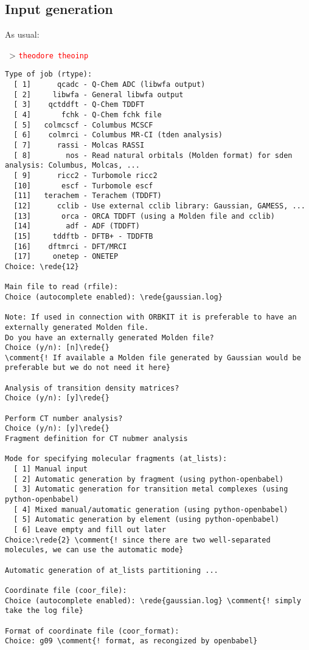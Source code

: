 \documentclass[DIV=12,headings=normal]{scrartcl}
\newcommand{\comment}[1]{\textcolor{blue}{#1}}
\newcommand{\redl}[1]{{\textcolor{red}{\texttt{#1}}}}
\newcommand{\rede}[1]{\redl{#1 <ENTER>}}
\newcommand{\comm}[1]{
\small
~> \redl{#1}
\normalsize
}
\newcounter{number}
\begin{document}
\subsection{Input generation}
As usual:

\comm{theodore theoinp}

\scriptsize
\begin{Verbatim}[commandchars=\\\{\}]
Type of job (rtype):
  [ 1]      qcadc - Q-Chem ADC (libwfa output)
  [ 2]     libwfa - General libwfa output
  [ 3]    qctddft - Q-Chem TDDFT
  [ 4]       fchk - Q-Chem fchk file
  [ 5]   colmcscf - Columbus MCSCF
  [ 6]    colmrci - Columbus MR-CI (tden analysis)
  [ 7]      rassi - Molcas RASSI
  [ 8]        nos - Read natural orbitals (Molden format) for sden analysis: Columbus, Molcas, ...
  [ 9]      ricc2 - Turbomole ricc2
  [10]       escf - Turbomole escf
  [11]   terachem - Terachem (TDDFT)
  [12]      cclib - Use external cclib library: Gaussian, GAMESS, ...
  [13]       orca - ORCA TDDFT (using a Molden file and cclib)
  [14]        adf - ADF (TDDFT)
  [15]     tddftb - DFTB+ - TDDFTB
  [16]    dftmrci - DFT/MRCI
  [17]     onetep - ONETEP
Choice: \rede{12}

Main file to read (rfile):
Choice (autocomplete enabled): \rede{gaussian.log}

Note: If used in connection with ORBKIT it is preferable to have an externally generated Molden file.
Do you have an externally generated Molden file?
Choice (y/n): [n]\rede{}
\comment{! If available a Molden file generated by Gaussian would be preferable but we do not need it here}

Analysis of transition density matrices?
Choice (y/n): [y]\rede{}

Perform CT number analysis?
Choice (y/n): [y]\rede{}
Fragment definition for CT nubmer analysis

Mode for specifying molecular fragments (at_lists):
  [ 1] Manual input
  [ 2] Automatic generation by fragment (using python-openbabel)
  [ 3] Automatic generation for transition metal complexes (using python-openbabel)
  [ 4] Mixed manual/automatic generation (using python-openbabel)
  [ 5] Automatic generation by element (using python-openbabel)
  [ 6] Leave empty and fill out later
Choice:\rede{2} \comment{! since there are two well-separated molecules, we can use the automatic mode}

Automatic generation of at_lists partitioning ...

Coordinate file (coor_file):
Choice (autocomplete enabled): \rede{gaussian.log} \comment{! simply take the log file}

Format of coordinate file (coor_format):
Choice: g09 \comment{! format, as recongized by openbabel}
\end{Verbatim}
\normalsize
\end{document}
